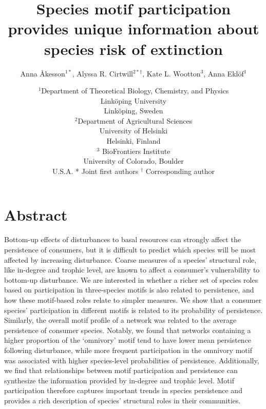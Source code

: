 \documentclass[12pt]{article}
\title{Species motif participation provides unique information about species risk of extinction}
\author{Anna \r{A}kesson$^{1*}$, Alyssa R. Cirtwill$^{2*\dagger}$, Kate L. Wootton$^{3}$, Anna Ekl\"{o}f$^{1}$}
\date{\small$^1$Department of Theoretical Biology, Chemistry, and Physics\\ 
Link\"{o}ping University\\
Link\"{o}ping, Sweden\\
\medskip
\small$^2$Department of Agricultural Sciences\\
University of Helsinki\\
Helsinki, Finland\\
\medskip
\small$^3$ BioFrontiers Institute\\
University of Colorado, Boulder\\
U.S.A.
\medskip
* Joint first authors
\medskip
$^\dagger$ Corresponding author\\
}
\begin{document}
 
\maketitle 
\linenumbers
\raggedright

\setlength{\parindent}{15pt} 


\section*{Abstract}


    Bottom-up effects of disturbances to basal resources can strongly affect the persistence of consumers, but it is difficult to predict which species will be most affected by increasing disturbance.
    Coarse measures of a species' structural role, like in-degree and trophic level, are known to affect a consumer's vulnerability to bottom-up disturbance.
    We are interested in whether a richer set of species roles based on participation in three-species motifs is also related to persistence, and how these motif-based roles relate to simpler measures.
    We show that a consumer species' participation in different motifs is related to its probability of persistence. 
    Similarly, the overall motif profile of a network was related to the average persistence of consumer species.
    Notably, we found that networks containing a higher proportion of the `omnivory' motif tend to have lower mean persistence following disturbance, while more frequent participation in the omnivory motif was associated with higher species-level probabilities of persistence.
    Additionally, we find that relationships between motif participation and persistence can synthesize the information provided by in-degree and trophic level.
    Motif participation therefore captures important trends in species persistence and provides a rich description of species' structural roles in their communities.
\end{document}

